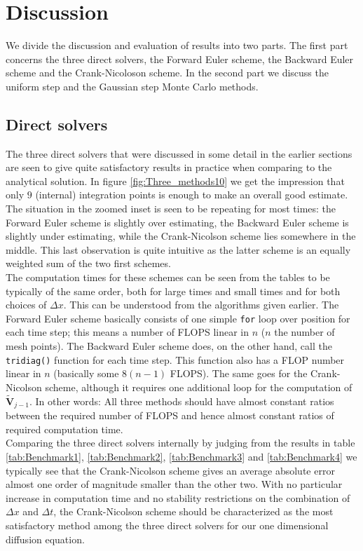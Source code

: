 \documentclass[a4paper, 11pt, notitlepage,english]{article}
\begin{document}
\newpage

\section{Discussion}
\label{sec:Discuss}
We divide the discussion and evaluation of results into two parts. The first part concerns the three direct solvers, the Forward Euler scheme, the Backward Euler scheme and the Crank-Nicoloson scheme. In the second part we discuss the uniform step and the Gaussian step Monte Carlo methods.

\subsection{Direct solvers}
The three direct solvers that were discussed in some detail in the earlier sections are seen to give quite satisfactory results in practice when comparing to the analytical solution. In figure \ref{fig:Three_methods10} we get the impression that only $9$ (internal) integration points is enough to make an overall good estimate. The situation in the zoomed inset is seen to be repeating for most times: the Forward Euler scheme is slightly over estimating, the Backward Euler scheme is slightly under estimating, while the Crank-Nicolson scheme lies somewhere in the middle. This last observation is quite intuitive as the latter scheme is an equally weighted sum of the two first schemes. \\

The computation times for these schemes can be seen from the tables to be typically of the same order, both for large times and small times and for both choices of $\Delta x$. This can be understood from the algorithms given earlier. The Forward Euler scheme basically consists of one simple \texttt{for} loop over position for each time step; this means a number of FLOPS linear in $n$ ($n$ the number of mesh points). The Backward Euler scheme does, on the other hand, call the \texttt{tridiag()} function for each time step. This function also has a FLOP number linear in $n$ (basically some $8(n-1)$ FLOPS). The same goes for the Crank-Nicolson scheme, although it requires one additional loop for the computation of $\tilde{\boldsymbol{V}}_{j-1}$. In other words: All three methods should have almost constant ratios between the required number of FLOPS and hence almost constant ratios of required computation time. \\

Comparing the three direct solvers internally by judging from the results in table \ref{tab:Benchmark1}, \ref{tab:Benchmark2}, \ref{tab:Benchmark3} and \ref{tab:Benchmark4} we typically see that the Crank-Nicolson scheme gives an average absolute error almost one order of magnitude smaller than the other two. With no particular increase in computation time and no stability restrictions on the combination of $\Delta x$ and $\Delta t$, the Crank-Nicolson scheme should be characterized as the most satisfactory method among the three direct solvers for our one dimensional diffusion equation. \\
\end{document}
